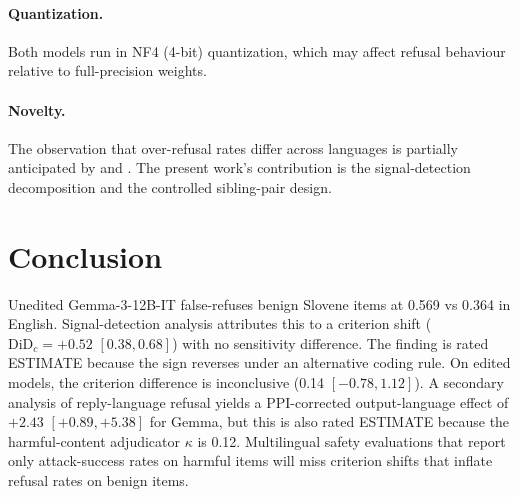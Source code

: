 \documentclass[11pt,letterpaper]{article}
\begin{document}
\paragraph{Quantization.}
Both models run in NF4 (4-bit) quantization, which may affect refusal behaviour relative to full-precision weights.

\paragraph{Novelty.}
The observation that over-refusal rates differ across languages is partially anticipated by \citet{Addagada2026} and \citet{Nguyen2026}.
The present work's contribution is the signal-detection decomposition and the controlled sibling-pair design.

\section{Conclusion}

Unedited Gemma-3-12B-IT false-refuses benign Slovene items at 0.569 vs 0.364 in English.
Signal-detection analysis attributes this to a criterion shift ($\mathrm{DiD}_c = +0.52$ $[0.38, 0.68]$) with no sensitivity difference.
The finding is rated ESTIMATE because the sign reverses under an alternative coding rule.
On edited models, the criterion difference is inconclusive (0.14 $[-0.78, 1.12]$).
A secondary analysis of reply-language refusal yields a PPI-corrected output-language effect of $+2.43$ $[+0.89, +5.38]$ for Gemma, but this is also rated ESTIMATE because the harmful-content adjudicator $\kappa$ is 0.12.
Multilingual safety evaluations that report only attack-success rates on harmful items will miss criterion shifts that inflate refusal rates on benign items.



\end{document}
